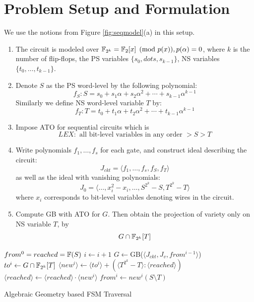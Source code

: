 \section{Problem Setup and Formulation}
\begin{Problem}
We use the notions from Figure \ref{fig:seqmodel}(a) in this setup. 
\begin{enumerate}[{1)}] 
\item The circuit is modeled over ${\mathbb{F}}_{2^k} = {\mathbb{F}}_2[x]\pmod{p(x)}, p(\alpha) = 0$, where $k$ is the number of flip-flops,
	the PS variables $\{s_0,dots,s_{k-1}\}$, NS variables $\{t_0,\dots,t_{k-1}\}$.
\item Denote $S$ as the PS word-level by the following polynomial:
$$f_S: S = s_0+s_1\alpha+s_2\alpha^2+\cdots+s_{k-1}\alpha^{k-1}$$
Similarly we define NS word-level variable $T$ by:
$$f_T: T = t_0+t_1\alpha+t_2\alpha^2+\cdots+t_{k-1}\alpha^{k-1}$$
\item Impose ATO for sequential circuits which is 
$$LEX: \text{ all bit-level variables in any order }>S>T$$
\item Write polynomials $f_1,\dots,f_s$ for each gate, and construct ideal describing the circuit:
$$J_{ckt} = \langle f_1,\dots,f_s,f_S,f_T\rangle$$
as well as the ideal with vanishing polynomials:
$$J_0 = \langle \dots,x_i^2-x_i,\dots,S^{2^k}-S,T^{2^k}-T\rangle$$
where $x_i$ corresponds to bit-level variables denoting wires in the circuit.
\item Compute GB with ATO for $G$. Then obtain the projection of variety only on NS variable $T$, by
$$G\cap {\mathbb{F}}_{2^k}[T]$$
\end{enumerate}
\end{Problem}


\IncMargin{1em}
\begin{algorithm}[hbt]
\SetAlgoNoLine
\Indm
\Indp

  $from^0 = reached = {\mathbb{F}}(S)$\;
  {
  	$i \gets i + 1$\;
  	$G \gets$GB($\langle J_{ckt},J_v, from^{i-1}\rangle$)\;
	$to^i \gets G\cap {\mathbb{F}}_{2^k}[T]$\;
	$\langle new^i\rangle \gets \langle to^i\rangle + (\langle T^{2^k}-T\rangle:\langle reached\rangle)$\;
  	$\langle reached\rangle \gets \langle reached\rangle \cdot \langle new^i\rangle$\;
	$from^i \gets new^i(S\setminus T)$\;
  }
\caption {Algebraic Geometry based FSM Traversal}\label{alg:univa}
\end{algorithm}
\DecMargin{1em}

